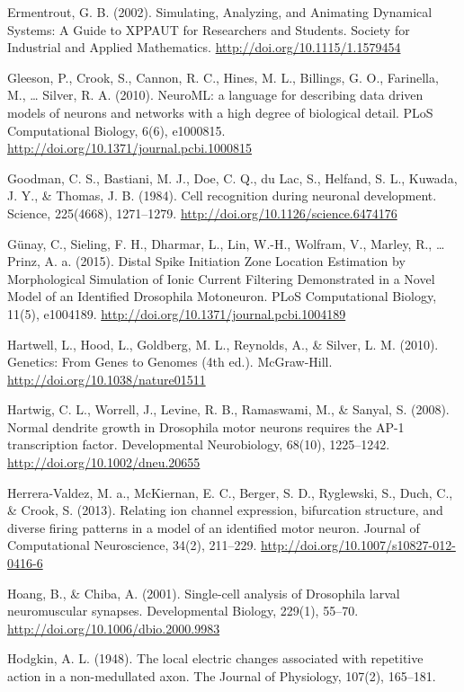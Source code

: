 \documentclass[12pt,a4paper,]{report}
\begin{document}
Ermentrout, G. B. (2002). Simulating, Analyzing, and Animating Dynamical
Systems: A Guide to XPPAUT for Researchers and Students. Society for
Industrial and Applied Mathematics.
\url{http://doi.org/10.1115/1.1579454}

Gleeson, P., Crook, S., Cannon, R. C., Hines, M. L., Billings, G. O.,
Farinella, M., \ldots{} Silver, R. A. (2010). NeuroML: a language for
describing data driven models of neurons and networks with a high degree
of biological detail. PLoS Computational Biology, 6(6), e1000815.
\url{http://doi.org/10.1371/journal.pcbi.1000815}

Goodman, C. S., Bastiani, M. J., Doe, C. Q., du Lac, S., Helfand, S. L.,
Kuwada, J. Y., \& Thomas, J. B. (1984). Cell recognition during neuronal
development. Science, 225(4668), 1271--1279.
\url{http://doi.org/10.1126/science.6474176}

Günay, C., Sieling, F. H., Dharmar, L., Lin, W.-H., Wolfram, V., Marley,
R., \ldots{} Prinz, A. a. (2015). Distal Spike Initiation Zone Location
Estimation by Morphological Simulation of Ionic Current Filtering
Demonstrated in a Novel Model of an Identified Drosophila Motoneuron.
PLoS Computational Biology, 11(5), e1004189.
\url{http://doi.org/10.1371/journal.pcbi.1004189}

Hartwell, L., Hood, L., Goldberg, M. L., Reynolds, A., \& Silver, L. M.
(2010). Genetics: From Genes to Genomes (4th ed.). McGraw-Hill.
\url{http://doi.org/10.1038/nature01511}

Hartwig, C. L., Worrell, J., Levine, R. B., Ramaswami, M., \& Sanyal, S.
(2008). Normal dendrite growth in Drosophila motor neurons requires the
AP-1 transcription factor. Developmental Neurobiology, 68(10),
1225--1242. \url{http://doi.org/10.1002/dneu.20655}

Herrera-Valdez, M. a., McKiernan, E. C., Berger, S. D., Ryglewski, S.,
Duch, C., \& Crook, S. (2013). Relating ion channel expression,
bifurcation structure, and diverse firing patterns in a model of an
identified motor neuron. Journal of Computational Neuroscience, 34(2),
211--229. \url{http://doi.org/10.1007/s10827-012-0416-6}

Hoang, B., \& Chiba, A. (2001). Single-cell analysis of Drosophila
larval neuromuscular synapses. Developmental Biology, 229(1), 55--70.
\url{http://doi.org/10.1006/dbio.2000.9983}

Hodgkin, A. L. (1948). The local electric changes associated with
repetitive action in a non-medullated axon. The Journal of Physiology,
107(2), 165--181.
\end{document}
